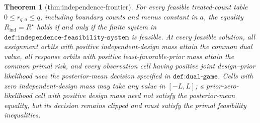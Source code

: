 \documentclass{article}
\newtheorem{theorem}{Theorem}
\begin{document}
\begin{theorem}[thm:independence-frontier]\label{thm:independence-frontier}
For every feasible treated-count table \(0\le r_{q,a}\le q\), including boundary counts and menus constant in \(a\), the equality \(R_{\mathrm{ind}}=R^\star\) holds if and only if the finite system in \(\texttt{def:independence-feasibility-system}\) is feasible. At every feasible solution, all assignment orbits with positive independent-design mass attain the common dual value, all response orbits with positive least-favorable-prior mass attain the common primal risk, and every observation cell having positive joint design--prior likelihood uses the posterior-mean decision specified in \(\texttt{def:dual-game}\). Cells with zero independent-design mass may take any value in \([-L,L]\); a prior-zero-likelihood cell with positive design mass need not satisfy the posterior-mean equality, but its decision remains clipped and must satisfy the primal feasibility inequalities.
\end{theorem}
\end{document}
